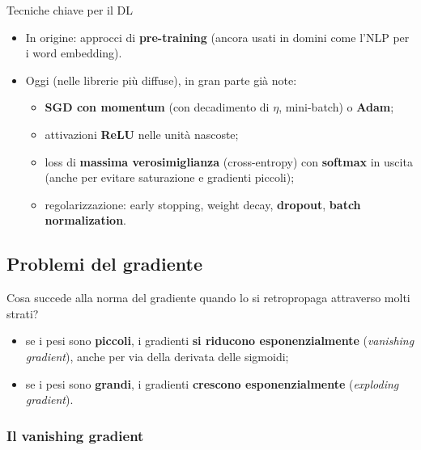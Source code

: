 \begin{boxabstract}{Tecniche chiave per il DL}

\begin{itemize}
\tightlist
\item
  In origine: approcci di \textbf{pre-training} (ancora usati in domini
  come l'NLP per i word embedding).
\item
  Oggi (nelle librerie più diffuse), in gran parte già note:

  \begin{itemize}
  \tightlist
  \item
    \textbf{SGD con momentum} (con decadimento di \(\eta\), mini-batch)
    o \textbf{Adam};
  \item
    attivazioni \textbf{ReLU} nelle unità nascoste;
  \item
    loss di \textbf{massima verosimiglianza} (cross-entropy) con
    \textbf{softmax} in uscita (anche per evitare saturazione e
    gradienti piccoli);
  \item
    regolarizzazione: early stopping, weight decay, \textbf{dropout},
    \textbf{batch normalization}.
  \end{itemize}
\end{itemize}

\end{boxabstract}

\subsection{Problemi del gradiente}\label{problemi-del-gradiente}

Cosa succede alla norma del gradiente quando lo si retropropaga
attraverso molti strati?

\begin{itemize}
\tightlist
\item
  se i pesi sono \textbf{piccoli}, i gradienti \textbf{si riducono
  esponenzialmente} (\emph{vanishing gradient}), anche per via della
  derivata delle sigmoidi;
\item
  se i pesi sono \textbf{grandi}, i gradienti \textbf{crescono
  esponenzialmente} (\emph{exploding gradient}).
\end{itemize}

\subsubsection{Il vanishing gradient}\label{il-vanishing-gradient}

